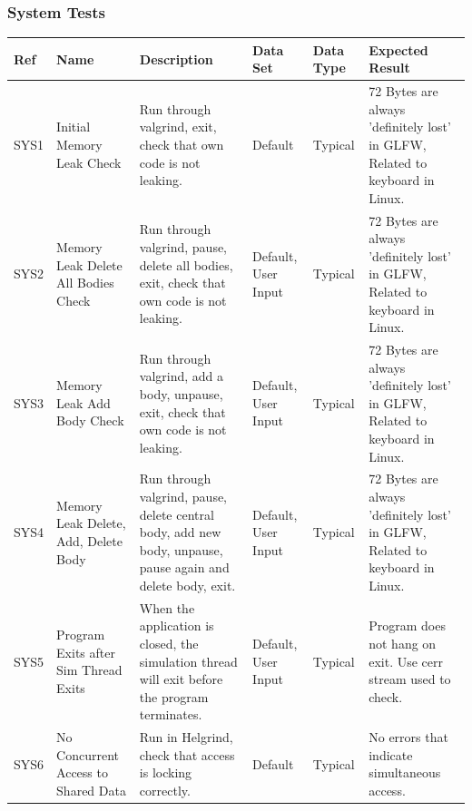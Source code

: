 \pagebreak
\vspace{12pt}
\begin{table}
\subsubsection{System Tests}
\centering
\scriptsize
\def\arraystretch{1.5}
\begin{tabular}{|M{0.8cm}|P{3cm}|P{5cm}|P{3cm}|P{3cm}|P{5cm}|}
\hline 
\textbf{Ref} & \textbf{Name} & \textbf{Description} & \textbf{Data Set} & \textbf{Data Type} & \textbf{Expected Result} \\ \hline
SYS1 & Initial Memory Leak Check & Run through valgrind, exit, check that own code is not leaking. & Default & Typical & 72 Bytes are always 'definitely lost' in GLFW, Related to keyboard in Linux. \\ \hline
SYS2 & Memory Leak Delete All Bodies Check & Run through valgrind, pause, delete all bodies, exit, check that own code is not leaking. & Default, User Input & Typical & 72 Bytes are always 'definitely lost' in GLFW, Related to keyboard in Linux. \\ \hline
SYS3 & Memory Leak Add Body Check & Run through valgrind, add a body, unpause, exit, check that own code is not leaking. & Default, User Input & Typical & 72 Bytes are always 'definitely lost' in GLFW, Related to keyboard in Linux. \\ \hline
SYS4 & Memory Leak Delete, Add, Delete Body & Run through valgrind, pause, delete central body, add new body, unpause, pause again and delete body, exit. & Default, User Input & Typical & 72 Bytes are always 'definitely lost' in GLFW, Related to keyboard in Linux. \\ \hline
SYS5 & Program Exits after Sim Thread Exits & When the application is closed, the simulation thread will exit before the program terminates. & Default, User Input & Typical & Program does not hang on exit. Use cerr stream used to check. \\ \hline
SYS6 & No Concurrent Access to Shared Data & Run in Helgrind, check that access is locking correctly. & Default & Typical & No errors that indicate simultaneous access. \\
\hline
\end{tabular}
\end{table}

